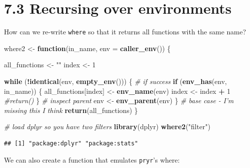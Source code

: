 \documentclass[]{book}
\newenvironment{Shaded}{\begin{snugshade}}{\end{snugshade}}
\newcommand{\CommentTok}[1]{\textcolor[rgb]{0.56,0.35,0.01}{\textit{#1}}}
\newcommand{\ControlFlowTok}[1]{\textcolor[rgb]{0.13,0.29,0.53}{\textbf{#1}}}
\newcommand{\DataTypeTok}[1]{\textcolor[rgb]{0.13,0.29,0.53}{#1}}
\newcommand{\DecValTok}[1]{\textcolor[rgb]{0.00,0.00,0.81}{#1}}
\newcommand{\KeywordTok}[1]{\textcolor[rgb]{0.13,0.29,0.53}{\textbf{#1}}}
\newcommand{\NormalTok}[1]{#1}
\newcommand{\OperatorTok}[1]{\textcolor[rgb]{0.81,0.36,0.00}{\textbf{#1}}}
\newcommand{\StringTok}[1]{\textcolor[rgb]{0.31,0.60,0.02}{#1}}
\begin{document}
\hypertarget{recursing-over-environments}{%
\section*{7.3 Recursing over environments}\label{recursing-over-environments}}

How can we re-write \texttt{where} so that it returns all functions with the same name?

\begin{Shaded}
\begin{Highlighting}[]
\NormalTok{where2 <-}\StringTok{ }\ControlFlowTok{function}\NormalTok{(in_name, }\DataTypeTok{env =} \KeywordTok{caller_env}\NormalTok{()) \{}
  
\NormalTok{  all_functions <-}\StringTok{ ""}
\NormalTok{  index <-}\StringTok{ }\DecValTok{1}

  \ControlFlowTok{while}\NormalTok{ (}\OperatorTok{!}\KeywordTok{identical}\NormalTok{(env, }\KeywordTok{empty_env}\NormalTok{())) \{}
    \CommentTok{# if success}
    \ControlFlowTok{if}\NormalTok{ (}\KeywordTok{env_has}\NormalTok{(env, in_name)) \{}
\NormalTok{      all_functions[index] <-}\StringTok{ }\KeywordTok{env_name}\NormalTok{(env)}
\NormalTok{      index <-}\StringTok{ }\NormalTok{index }\OperatorTok{+}\StringTok{ }\DecValTok{1}
      \CommentTok{#return()}
\NormalTok{    \}}
    \CommentTok{# inspect parent}
\NormalTok{    env <-}\StringTok{ }\KeywordTok{env_parent}\NormalTok{(env)}
\NormalTok{  \}}
  \CommentTok{# base case - I'm missing this I think}
  \KeywordTok{return}\NormalTok{(all_functions)}
\NormalTok{\}}

\CommentTok{# load dplyr so you have two filters}
\KeywordTok{library}\NormalTok{(dplyr)}
\KeywordTok{where2}\NormalTok{(}\StringTok{"filter"}\NormalTok{)}
\end{Highlighting}
\end{Shaded}

\begin{verbatim}
## [1] "package:dplyr" "package:stats"
\end{verbatim}

We can also create a function that emulates \texttt{pryr}'s where:
\end{document}
